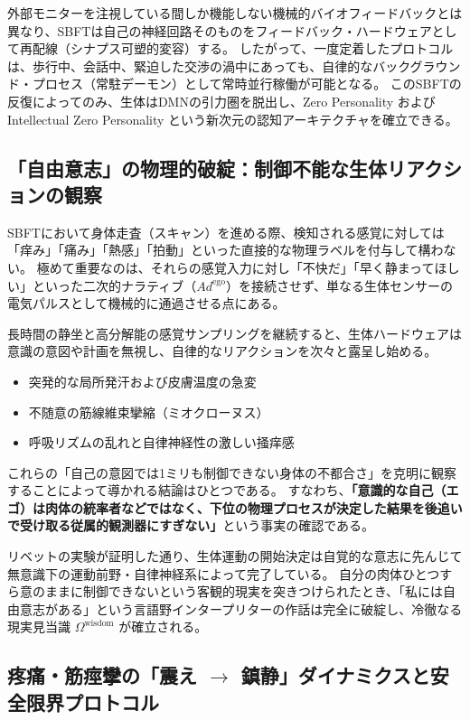 外部モニターを注視している間しか機能しない機械的バイオフィードバックとは異なり、SBFTは自己の神経回路そのものをフィードバック・ハードウェアとして再配線（シナプス可塑的変容）する。
したがって、一度定着したプロトコルは、歩行中、会話中、緊迫した交渉の渦中にあっても、自律的なバックグラウンド・プロセス（常駐デーモン）として常時並行稼働が可能となる。
このSBFTの反復によってのみ、生体はDMNの引力圏を脱出し、Zero Personality および Intellectual Zero Personality という新次元の認知アーキテクチャを確立できる。

\subsection{「自由意志」の物理的破綻：制御不能な生体リアクションの観察}

SBFTにおいて身体走査（スキャン）を進める際、検知される感覚に対しては「痒み」「痛み」「熱感」「拍動」といった直接的な物理ラベルを付与して構わない。
極めて重要なのは、それらの感覚入力に対し「不快だ」「早く静まってほしい」といった二次的ナラティブ（$Ad^{\mathrm{ego}}$）を接続させず、単なる生体センサーの電気パルスとして機械的に通過させる点にある。

長時間の静坐と高分解能の感覚サンプリングを継続すると、生体ハードウェアは意識の意図や計画を無視し、自律的なリアクションを次々と露呈し始める。
\begin{itemize}
    \item 突発的な局所発汗および皮膚温度の急変
    \item 不随意の筋線維束攣縮（ミオクローヌス）
    \item 呼吸リズムの乱れと自律神経性の激しい掻痒感
\end{itemize}

これらの「自己の意図では1ミリも制御できない身体の不都合さ」を克明に観察することによって導かれる結論はひとつである。
すなわち、\textbf{「意識的な自己（エゴ）は肉体の統率者などではなく、下位の物理プロセスが決定した結果を後追いで受け取る従属的観測器にすぎない」}という事実の確認である。

リベットの実験が証明した通り、生体運動の開始決定は自覚的な意志に先んじて無意識下の運動前野・自律神経系によって完了している。
自分の肉体ひとつすら意のままに制御できないという客観的現実を突きつけられたとき、「私には自由意志がある」という言語野インタープリターの作話は完全に破綻し、冷徹なる現実見当識 $\Omega^{\mathrm{wisdom}}$ が確立される。

\subsection{疼痛・筋痙攣の「震え $\to$ 鎮静」ダイナミクスと安全限界プロトコル}

